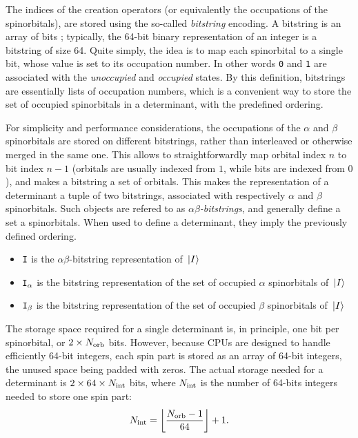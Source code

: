 \documentclass[./thesis.tex]{subfiles}
\begin{document}
The indices of the creation operators (or equivalently the
occupations of the spinorbitals), are stored using the so-called \emph{bitstring} encoding. A bitstring is an array of bits ; typically, the 64-bit binary representation of an integer is a bitstring of size 64.
Quite simply, the idea is to map each spinorbital to a single bit, whose value is set to its occupation number. In other words \texttt{0} and \texttt{1} are associated with the \emph{unoccupied} and \emph{occupied} states.
By this definition, bitstrings are essentially lists of occupation numbers, which is a convenient way to
store the set of occupied spinorbitals in a determinant, with the predefined ordering.

For simplicity and performance considerations, the occupations of the $\alpha$ and $\beta$ spinorbitals are stored on different bitstrings, rather than interleaved or otherwise merged in the same one. This allows to straightforwardly map orbital index $n$ to bit index $n-1$ (orbitals are usually indexed from $1$, while bits are indexed from $0$), and makes a bitstring a set of orbitals.
This makes the representation of a determinant a tuple of two bitstrings, associated with respectively $\alpha$ and $\beta$ spinorbitals. Such objects are refered to as \emph{$\alpha \beta$-bitstrings}, and generally define a set a spinorbitals. When used to define a determinant, they imply the previously defined ordering.


\begin{itemize}
\item
${\texttt{I}}$ is the $\alpha \beta$-bitstring representation of ${\ket*{I}}$
\item
${\texttt{I}}_\alpha$ is the bitstring representation of the set of occupied $\alpha$ spinorbitals of ${\ket*{I}}$ 
\item
${\texttt{I}}_\beta$ is the bitstring representation of the set of occupied $\beta$ spinorbitals of ${\ket*{I}}$ 

\end{itemize}


The storage space required for a single determinant is, in principle, one bit per spinorbital, or $2 \times {N_\text{orb}}$ bits. However, because CPUs are designed to handle efficiently 64-bit integers, each spin part is stored as an array of 64-bit integers, the unused space being padded with zeros. 
The actual storage needed for a determinant is $2 \times 64 \times {N_\text{int}}$ bits, where ${N_\text{int}}$ is the number of 64-bits integers needed to store one spin part:
\begin{equation}
{N_\text{int}} = \left \lfloor \frac{{N_\text{orb}}-1}{64} \right \rfloor + 1.
\end{equation}
\end{document}
